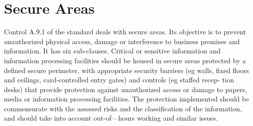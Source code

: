 \section{Secure Areas}
Control A.9.1 of the standard deals with secure areas. Its objective is to prevent
unauthorized physical access, damage or interference to business premises
and information. It has six sub-clauses. Critical or sensitive information and
information processing facilities should be housed in secure areas protected
by a defined secure perimeter, with appropriate security barriers (eg walls, fixed
floors and ceilings, card-controlled entry gates) and controls (eg staffed recep-
tion desks) that provide protection against unauthorized access or damage to
papers, media or information processing facilities. The protection implemented
should be commensurate with the assessed risks and the classification of the
information, and should take into account out-of—hours working and similar
issues.

